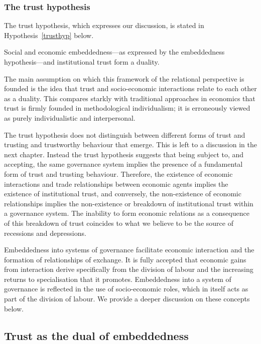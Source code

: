 \begin{subappendices}
\subsubsection{The trust hypothesis}

The trust hypothesis, which expresses our discussion, is stated in Hypothesis~\ref{trusthyp} below.

\begin{hypothesis} \label{trusthyp}
Social and economic embeddedness---as expressed by the embeddedness hypothesis---and institutional trust form a duality.
\end{hypothesis}

The main assumption on which this framework of the relational perspective is founded is the idea that trust and socio-economic interactions relate to each other as a duality. This compares starkly with traditional approaches in economics that trust is firmly founded in methodological individualism; it is erroneously viewed as purely individualistic and interpersonal.

The trust hypothesis does not distinguish between different forms of trust and trusting and trustworthy behaviour that emerge. This is left to a discussion in the next chapter. Instead the trust hypothesis suggests that being subject to, and accepting, the same governance system implies the presence of a fundamental form of trust and trusting behaviour. Therefore, the existence of economic interactions and trade relationships between economic agents implies the existence of institutional trust, and conversely, the non-existence of economic relationships implies the non-existence or breakdown of institutional trust within a governance system. The inability to form economic relations as a consequence of this breakdown of trust coincides to what we believe to be the source of recessions and depressions.

\medskip \noindent Embeddedness into systems of governance facilitate economic interaction and the formation of relationships of exchange. It is fully accepted that economic gains from interaction derive specifically from the division of labour and the increasing returns to specialisation that it promotes. Embeddedness into a system of governance is reflected in the use of socio-economic roles, which in itself acts as part of the division of labour. We provide a deeper discussion on these concepts below.

\subsection{Trust as the dual of embeddedness}


\end{subappendices}
